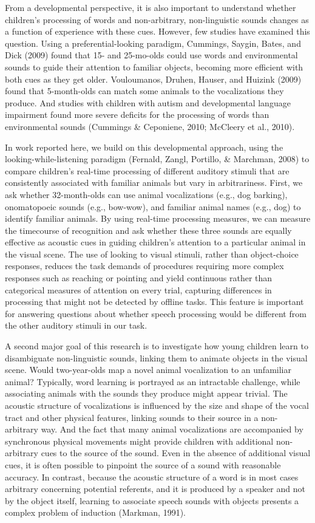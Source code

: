 \documentclass[english,floatsintext,man]{apa6}
\theoremstyle{definition}
\theoremstyle{definition}
\theoremstyle{definition}
\theoremstyle{remark}
\begin{document}
From a developmental perspective, it is also important to understand
whether children's processing of words and non-arbitrary, non-linguistic
sounds changes as a function of experience with these cues. However, few
studies have examined this question. Using a preferential-looking
paradigm, Cummings, Saygin, Bates, and Dick (2009) found that 15- and
25-mo-olds could use words and environmental sounds to guide their
attention to familiar objects, becoming more efficient with both cues as
they get older. Vouloumanos, Druhen, Hauser, and Huizink (2009) found
that 5-month-olds can match some animals to the vocalizations they
produce. And studies with children with autism and developmental
language impairment found more severe deficits for the processing of
words than environmental sounds (Cummings \& Ceponiene, 2010; McCleery
et al., 2010).

In work reported here, we build on this developmental approach, using
the looking-while-listening paradigm (Fernald, Zangl, Portillo, \&
Marchman, 2008) to compare children's real-time processing of different
auditory stimuli that are consistently associated with familiar animals
but vary in arbitrariness. First, we ask whether 32-month-olds can use
animal vocalizations (e.g., dog barking), onomatopoeic sounds (e.g.,
bow-wow), and familiar animal names (e.g., dog) to identify familiar
animals. By using real-time processing measures, we can measure the
timecourse of recognition and ask whether these three sounds are equally
effective as acoustic cues in guiding children's attention to a
particular animal in the visual scene. The use of looking to visual
stimuli, rather than object-choice responses, reduces the task demands
of procedures requiring more complex responses such as reaching or
pointing and yield continuous rather than categorical measures of
attention on every trial, capturing differences in processing that might
not be detected by offline tasks. This feature is important for
answering questions about whether speech processing would be different
from the other auditory stimuli in our task.

A second major goal of this research is to investigate how young
children learn to disambiguate non-linguistic sounds, linking them to
animate objects in the visual scene. Would two-year-olds map a novel
animal vocalization to an unfamiliar animal? Typically, word learning is
portrayed as an intractable challenge, while associating animals with
the sounds they produce might appear trivial. The acoustic structure of
vocalizations is influenced by the size and shape of the vocal tract and
other physical features, linking sounds to their source in a
non-arbitrary way. And the fact that many animal vocalizations are
accompanied by synchronous physical movements might provide children
with additional non-arbitrary cues to the source of the sound. Even in
the absence of additional visual cues, it is often possible to pinpoint
the source of a sound with reasonable accuracy. In contrast, because the
acoustic structure of a word is in most cases arbitrary concerning
potential referents, and it is produced by a speaker and not by the
object itself, learning to associate speech sounds with objects presents
a complex problem of induction (Markman, 1991).
\end{document}
